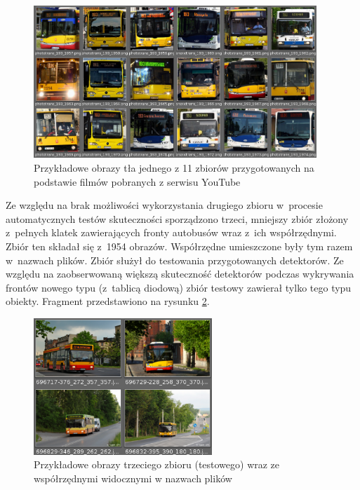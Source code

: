 \begin{figure}[!h]
	\centering
	\includegraphics[width=0.95\textwidth]{img/exp_second_crop_sample}
	\caption{Przykładowe obrazy tła jednego z 11 zbiorów
		przygotowanych na podstawie
		filmów pobranych z serwisu YouTube}
	\label{fig:exp_second_crop_sample}
\end{figure}

Ze względu na brak możliwości wykorzystania drugiego zbioru
w~procesie automatycznych testów skuteczności sporządzono trzeci,
mniejszy zbiór złożony z~pełnych klatek zawierających
fronty autobusów wraz z~ich współrzędnymi. Zbiór ten składał się
z~1954 obrazów. Współrzędne umieszczone były tym razem w~nazwach
plików. Zbiór służył do testowania przygotowanych detektorów. 
Ze względu na zaobserwowaną większą skuteczność detektorów podczas
wykrywania frontów nowego typu (z~tablicą diodową) zbiór testowy
zawierał tylko tego typu obiekty. Fragment przedstawiono na rysunku
\ref{fig:exp_third_whole_sample}.

\begin{figure}[!h]
	\centering
	\includegraphics[width=0.6\textwidth]{img/exp_third_whole_sample}
	\caption{Przykładowe obrazy trzeciego zbioru (testowego) 
		wraz ze współrzędnymi widocznymi w nazwach plików}
	\label{fig:exp_third_whole_sample}
\end{figure}

